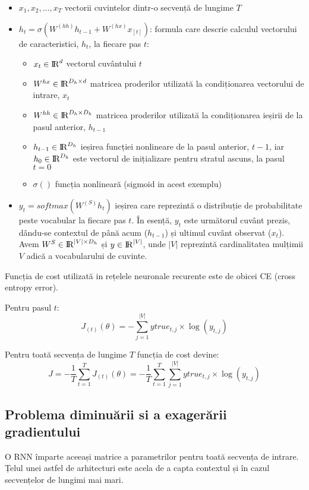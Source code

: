 \begin{itemize}
	\item $x_1, x_2, ..., x_T$ vectorii cuvintelor dintr-o secvență de lungime $T$
	\item $h_t = \sigma{(W^{(hh)} h_{t-1} + W^{(hx)} x_{[t]})}$: formula care descrie calculul vectorului de caracteristici, $h_t$, la fiecare pas $t$:
	
	\begin{itemize}
		\item $ x_t \in {\rm I\!R}^d $ vectorul cuvântului $t$
		\item $ W^{hx} \in {\rm I\!R}^{D_h \times d} $ matricea proderilor utilizată la condiționarea vectorului de intrare, $x_t$
		\item $ W^{hh} \in {\rm I\!R}^{D_h \times D_h} $ matricea proderilor utilizată la condiționarea ieșirii de la pasul anterior, $h_{t-1}$
		\item $ h_{t-1} \in  {\rm I\!R}^{D_h} $ ieșirea funcției nonlineare de la pasul anterior, $t-1$, iar $h_0 \in  {\rm I\!R}^{D_h}$ este vectorul de inițializare pentru stratul ascuns, la pasul $t=0$
		\item $ \sigma() $ funcția nonlineară  (sigmoid in acest exemplu)
	\end{itemize}

	\item $ y_t = softmax(W^{(S)} h_t) $ ieșirea care reprezintă o distribuție de probabilitate peste vocabular la fiecare pas $t$. În esență, $y_t$ este următorul cuvânt prezis, dându-se contextul de până  acum ($ h_{t-1} $) și ultimul cuvânt observat ($x_t$). Avem  $ W^{S} \in {\rm I\!R}^{|V| \times D_h} $ și $ y \in {\rm I\!R}^{|V|} $, unde $|V|$ reprezintă cardinalitatea mulțimii $V$ adică a vocabularului de cuvinte.

\end{itemize}

Funcția de cost utilizată in rețelele neuronale recurente este de obicei CE (cross entropy error).

Pentru pasul $t$:
$$
J_{(t)}(\theta) = - \sum_{j=1}^{|V|}  ytrue_{t, j} \times \log(y_{t, j})
$$

Pentru toată secvența de lungime $T$ funcția de cost devine:
$$
J = - \frac{1}{T} \sum_{t=1}^{T} J_{(t)}(\theta) = - \frac{1}{T} \sum_{t=1}^{T}  \sum_{j=1}^{|V|}  ytrue_{t, j} \times \log(y_{t, j})
$$

\cite{cs224d_notes}


\subsection{Problema diminuării si a exagerării gradientului}
O RNN împarte aceeași matrice a parametrilor pentru toată secvența de intrare. Țelul unei astfel de arhitecturi este acela de a capta contextul și în cazul secvențelor de lungimi mai mari.

